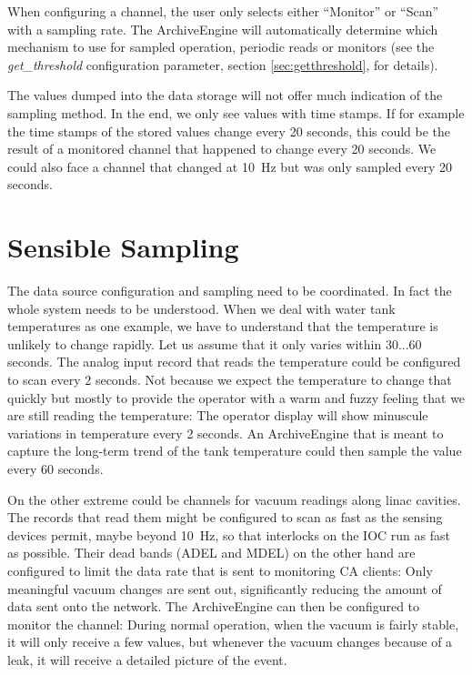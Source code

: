 When configuring a channel, the user only selects either ``Monitor''
or ``Scan'' with a sampling rate.  The ArchiveEngine will
automatically determine which mechanism to use for sampled operation,
periodic reads or monitors (see the \emph{get\_threshold} configuration
parameter, section \ref{sec:getthreshold}, for details).

\NOTE The values dumped into the data storage will not offer much
indication of the sampling method. In the end, we only see values with
time stamps. If for example the time stamps of the stored values
change every 20 seconds, this could be the result of a monitored
channel that happened to change every 20 seconds. We could also face a
channel that changed at 10~Hz but was only sampled every 20 seconds. 


\section{Sensible Sampling}
The data source configuration and sampling need to be coordinated.  In
fact the whole system needs to be understood. When we deal with water
tank temperatures as one example, we have to understand that the
temperature is unlikely to change rapidly. Let us assume that it only
varies within 30...60 seconds. The analog input record that reads the
temperature could be configured to scan every 2 seconds. Not because
we expect the temperature to change that quickly but mostly to provide
the operator with a warm and fuzzy feeling that we are still reading
the temperature: The operator display will show minuscule variations
in temperature every 2 seconds.  An ArchiveEngine that is meant to
capture the long-term trend of the tank temperature could then sample
the value every 60 seconds.

On the other extreme could be channels for vacuum readings along linac
cavities. The records that read them might be configured to scan as
fast as the sensing devices permit, maybe beyond 10~Hz, so that
interlocks on the IOC run as fast as possible. Their dead bands (ADEL
and MDEL) on the other hand are configured to limit the data rate that
is sent to monitoring CA clients: Only meaningful vacuum changes are
sent out, significantly reducing the amount of data sent onto the
network.  The ArchiveEngine can then be configured to monitor the
channel: During normal operation, when the vacuum is fairly stable, it
will only receive a few values, but whenever the vacuum changes
because of a leak, it will receive a detailed picture of the event.

